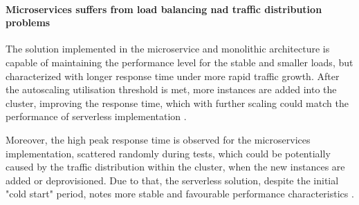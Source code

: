 

\paragraph*{Microservices suffers from load balancing nad traffic distribution problems}

The solution implemented in the microservice and monolithic architecture is capable of maintaining the performance level for the stable and smaller loads, but characterized with longer response time under more rapid traffic growth. After the autoscaling utilisation threshold is met, more instances are added into the cluster, improving the response time, which with further scaling could match the performance of serverless implementation \cite{ServerlessComputingAnInvestigationOfDeploymentEnvironmentsForWebAPIs}.

Moreover, the high peak response time is observed for the microservices implementation, scattered randomly during tests, which could be potentially caused by the traffic distribution within the cluster, when the new instances are added or deprovisioned. Due to that, the serverless solution, despite the initial "cold start" period, notes more stable and favourable performance characteristics \cite{MicroservicesvsServerlessAPerformanceComparisonOnCloudNativeWebApplication}.





